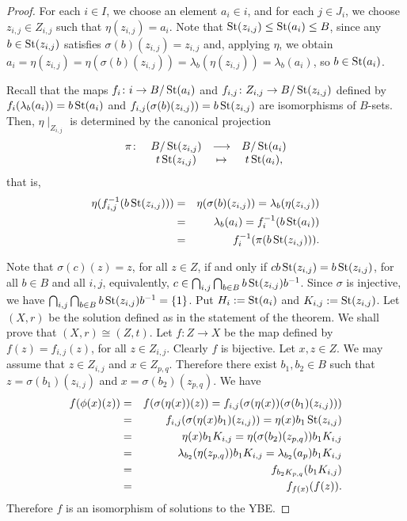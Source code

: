 \begin{proof}
	For each $i\in I$, we choose an element $a_i\in i$, and for each
	$j\in J_i$, we choose $z_{i,j}\in Z_{i,j}$ such that
	$\eta(z_{i,j})=a_i$. Note that  $\operatorname{St}(z_{i,j})\leq \operatorname{St}(a_i)\leq B$,
	since any $b\in \operatorname{St}(z_{i,j})$ satisfies $\sigma(b)(z_{i,j})=z_{i,j}$
	and, applying $\eta$, we obtain
	$a_i=\eta(z_{i,j})=\eta(\sigma(b)(z_{i,j}))=\lambda_b(\eta(z_{i,j}))=\lambda_b(a_i)$,
	so $b\in \operatorname{St}(a_i)$.
	
	Recall that the maps $f_i\colon i\rightarrow B/\operatorname{St}(a_i)$ and
	$f_{i,j}\colon Z_{i,j}\rightarrow B/\operatorname{St}(z_{i,j})$ defined by
	$f_{i}(\lambda_b(a_i))= b\operatorname{St}(a_i)$ and $f_{i,j}(\sigma(b)(z_{i,j}))=
	b\operatorname{St}(z_{i,j})$ are isomorphisms of $B$-sets.
	Then,
	$\eta\mid_{Z_{i,j}}$ is determined by the canonical projection
	$$
	\begin{array}{cccc}
		\pi \colon &B/\operatorname{St}(z_{i,j})&\longrightarrow &B/\operatorname{St}(a_i)\\
		&t\operatorname{St}(z_{i,j})&\mapsto &t\operatorname{St}(a_i),
	\end{array}
	$$
	that is, \begin{eqnarray*}
		\eta(f_{i,j}^{-1}(b\operatorname{St}(z_{i,j})))&=&\eta(\sigma(b)(z_{i,j}))=\lambda_b(\eta(z_{i,j}))\\
		&=&
		\lambda_b(a_{i})=f_i^{-1}(b\operatorname{St}(a_i))\\
		&=&f_i^{-1}(\pi(b\operatorname{St}(z_{i,j})))  .\end{eqnarray*}
	
	Note that $\sigma(c)(z)=z$, for all $z\in Z$, if and only if
	$cb\operatorname{St}(z_{i,j})=b\operatorname{St}(z_{i,j})$, for all $b\in B$ and all $i,j$,
	equivalently,  $c\in\bigcap_{i,j} \bigcap_{b\in
		B}b\operatorname{St}(z_{i,j})b^{-1}$. Since $\sigma$ is injective, we have
	$\bigcap_{i,j} \bigcap_{b\in B}b\operatorname{St}(z_{i,j})b^{-1}=\{ 1\}$.  Put
	$H_i:=\operatorname{St}(a_i)$ and $K_{i,j}:=\operatorname{St}(z_{i,j})$.  Let $(X,r)$ be the
	solution defined as in the statement of the theorem. We shall
	prove that $(X,r)\cong (Z,t)$. Let $f\colon Z\longrightarrow X$ be
	the map defined by $f(z)=f_{i,j}(z)$, for all $z\in Z_{i,j}$.
	Clearly $f$ is bijective. Let $x,z\in Z$. We may assume that $z\in
	Z_{i,j}$ and $x\in Z_{p,q}$. Therefore there exist $b_1,b_2\in B$
	such that $z=\sigma(b_1)(z_{i,j})$ and $x=\sigma(b_2)(z_{p,q})$. We
	have
	\begin{eqnarray*}
		f(\phi(x)(z))&=&f(\sigma(\eta(x))(z))=f_{i,j}(\sigma(\eta(x))(\sigma(b_1)(z_{i,j})))\\
		&=&f_{i,j}(\sigma(\eta(x)b_1)(z_{i,j}))=\eta(x)b_1\operatorname{St}(z_{i,j})\\
		&=&\eta(x)b_1K_{i,j}=\eta(\sigma(b_2)(z_{p,q}))b_1K_{i,j}\\
		&=&\lambda_{b_2}(\eta(z_{p,q}))b_1K_{i,j}=\lambda_{b_2}(a_p)b_1K_{i,j}\\
		&=&f_{b_2K_{p,q}}(b_1K_{i,j})\\
		&=&f_{f(x)}(f(z)).
	\end{eqnarray*}
	Therefore $f$ is an isomorphism of solutions to the YBE.
\end{proof}



